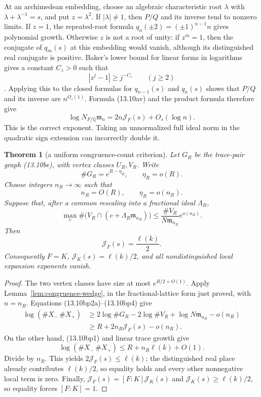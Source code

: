 \documentclass[11pt,reqno]{amsart}
\newtheorem{theorem}{Theorem}[section]
\theoremstyle{definition}
\theoremstyle{remark}
\newcommand{\Q}{\mathbb Q}
\begin{document}
At an archimedean embedding, choose an algebraic characteristic root
\(\lambda\) with \(\lambda+\lambda^{-1}=s\), and put \(z=\lambda^2\).
If \(|\lambda|\ne1\), then \(P/Q\) and its inverse tend to nonzero limits.
If \(z=1\), the repeated-root formula
\(q_n(\mathord\pm2)=(\mathord\pm1)^{n-1}n\) gives polynomial growth.
Otherwise \(z\) is not a root of unity: if \(z^m=1\), then the conjugate of
\(q_m(s)\) at this embedding would vanish, although its distinguished real
conjugate is positive.
Baker's lower bound for linear forms in logarithms gives a constant
\(C_z>0\) such that
\[
 |z^j-1|\ge j^{-C_z}\qquad(j\ge2)
\]
\cite{BakerLinearForms}.  Applying this to the closed formulas for
\(q_{n-1}(s)\) and \(q_n(s)\) shows that \(P/Q\) and its inverse are
\(n^{O_s(1)}\).  Formula (13.10av) and the product formula therefore give
\[
 \log N_{F/\Q}\mathfrak m_n
 =2n\mathcal J_F(s)+O_s(\log n).
\tag{13.10bp2a}
\]
This is the correct exponent.  Taking an unnormalized full ideal norm in
the quadratic sign extension can incorrectly double it.

\begin{theorem}[a uniform congruence-count criterion]
\label{thm:congruence-occupancy-bridge}
Let \(G_R\) be the trace-pair graph (13.10be), with vertex classes
\(U_R,V_R\).  Write
\[
 \#G_R=e^{R-\eta_R},\qquad \eta_R=o(R).
\]
Choose integers \(n_R\to\infty\) such that
\[
 n_R=O(R),\qquad \eta_R=o(n_R).
\tag{13.10bp3}
\]
Suppose that, after a common rescaling into a fractional ideal \(\Lambda_R\),
\[
 \max_c\#\bigl(V_R\cap(c+\Lambda_R\mathfrak m_{n_R})\bigr)
 \le
 \frac{\#V_R}{N\mathfrak m_{n_R}}e^{o(n_R)}.
\tag{13.10bp4}
\]
Then
\[
 \mathcal J_F(s)=\frac{\ell(k)}2.
\]
Consequently \(F=K\), \(\mathcal J_K(s)=\ell(k)/2\), and all
nondistinguished local expansion exponents vanish.
\end{theorem}

\begin{proof}
The two vertex classes have size at most \(e^{R/2+O(1)}\).  Apply
Lemma~\ref{lem:congruence-wedge}, in the fractional-lattice form just
proved, with \(n=n_R\).  Equations (13.10bp2a)--(13.10bp4) give
\[
 \begin{split}
 \log(\#X_-\,\#X_+)
 &\ge 2\log\#G_R-2\log\#V_R
       +\log N\mathfrak m_{n_R}-o(n_R)\\
 &\ge R+2n_R\mathcal J_F(s)-o(n_R).
 \end{split}
\]
On the other hand, (13.10bp1) and linear trace growth give
\[
 \log(\#X_-\,\#X_+)\le R+n_R\ell(k)+O(1).
\]
Divide by \(n_R\).  This yields
\(2\mathcal J_F(s)\le\ell(k)\); the distinguished real place already
contributes \(\ell(k)/2\), so equality holds and every other nonnegative
local term is zero.  Finally,
\(\mathcal J_F(s)=[F:K]\mathcal J_K(s)\) and
\(\mathcal J_K(s)\ge\ell(k)/2\), so equality forces \([F:K]=1\).
\end{proof}
\end{document}
